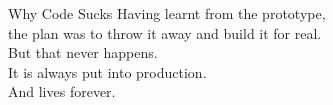 \documentclass[bigger]{beamer}
\begin{document}
\begin{frame}{Why Code Sucks}
{    Having learnt from the prototype,\\
    the plan was to throw it away and build it for real.\\
    But that never happens.\\
    It is always put into production.\\
    And lives forever.
  }
\end{frame}
\end{document}
